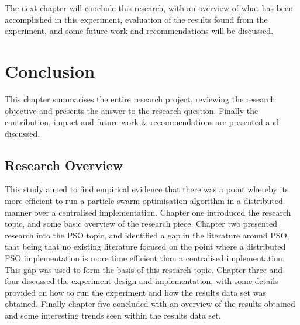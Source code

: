 \documentclass[oneside,12pt]{book}
\begin{document}
The next chapter will conclude this research, with an overview of what has been accomplished in this experiment, evaluation of the results found from the experiment, and some future work and recommendations will be discussed. 


\chapter{Conclusion}
This chapter summarises the entire research project, reviewing the research objective and presents the answer to the research question. Finally the contribution, impact and future work \& recommendations are presented and discussed. 

\section{Research Overview}
This study aimed to find empirical evidence that there was a point whereby its  more  efficient  to  run a particle swarm optimisation algorithm in a distributed manner over a centralised implementation. Chapter one introduced the research topic, and some basic overview of the research piece. Chapter two presented research into the PSO topic, and identified a gap in the literature around PSO, that being that no existing literature focused on the point where a distributed PSO implementation is more time efficient than a centralised implementation. This gap was used to form the basis of this research topic. Chapter three and four discussed the experiment design and implementation, with some details provided on how to run the experiment and how the results data set was obtained. Finally chapter five concluded with an overview of the results obtained and some interesting trends seen within the results data set. 
\end{document}
